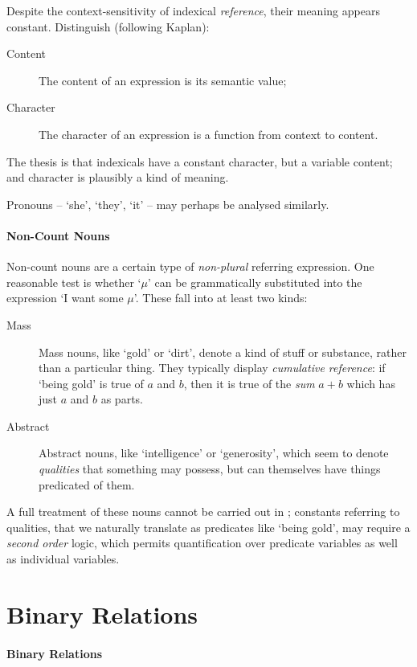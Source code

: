 Despite the context-sensitivity of indexical \emph{reference}, their meaning appears constant. Distinguish (following Kaplan):  \begin{description}
	\item [Content] The content of an expression is its semantic value;
	\item [Character] The character of an expression is a function from context to content.
\end{description} The thesis is that indexicals have a constant character, but a variable content; and character is plausibly a kind of meaning.

Pronouns – `she', `they', `it' – may perhaps be analysed similarly.




\paragraph{Non-Count Nouns}
Non-count nouns are a certain type of \emph{non-plural} referring expression. One reasonable test is whether `$\mu$'  can be grammatically substituted into the expression `I want some $\mu$'. 
 These fall into at least two kinds: \begin{description}
	\item [Mass] Mass nouns, like `gold' or `dirt', denote a kind of stuff or substance, rather than a particular thing. They typically display \emph{cumulative reference}: if `being gold' is true of $a$ and $b$, then it is true of the \emph{sum} $a+b$ which has just $a$ and $b$ as parts.
	\item [Abstract] Abstract nouns, like `intelligence' or `generosity', which seem to denote \emph{qualities} that something may possess, but can themselves have things predicated of them.  
\end{description}
A full treatment of these nouns cannot be carried out in \ltwo; constants referring to qualities, that we naturally translate as predicates like `being gold', may require a \emph{second order} logic, which permits quantification over predicate variables as well as individual variables. 





\section{Binary Relations}




\paragraph{Binary Relations}

